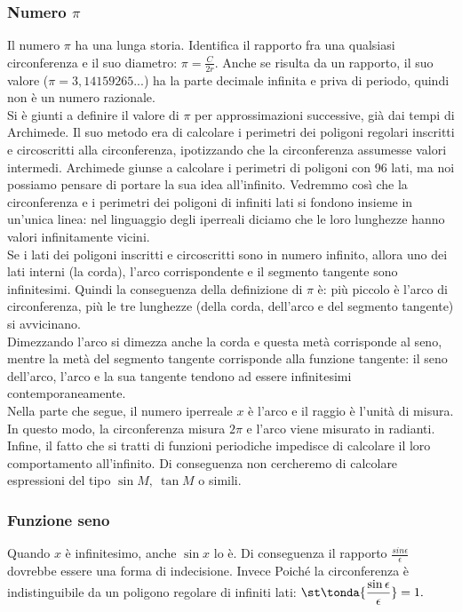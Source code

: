 \subsubsection{Numero $\pi$}
\label{subsubsec:insnum_pigreco}
Il numero $\pi$ ha una lunga storia. Identifica 
il rapporto fra una qualsiasi circonferenza e il suo diametro: 
$\pi=\frac{C}{2r}$. 
Anche se risulta da un rapporto, il suo valore ($\pi=3,14159265...$) 
ha la parte decimale infinita e priva di periodo, quindi non è un numero 
razionale.\\
Si è giunti a definire il valore di \(\pi\) per approssimazioni
successive, già dai tempi di Archimede. Il suo metodo era di
calcolare i perimetri dei poligoni regolari inscritti e
circoscritti alla circonferenza, ipotizzando che la circonferenza
assumesse valori intermedi. Archimede giunse a calcolare i perimetri
di poligoni con 96 lati, ma noi possiamo pensare di portare la sua idea
all'infinito. Vedremmo così che la circonferenza e i perimetri dei poligoni 
di infiniti lati si fondono insieme in un'unica linea: nel linguaggio degli
iperreali diciamo che le loro lunghezze hanno valori infinitamente vicini.\\
Se i lati dei poligoni inscritti e circoscritti sono in numero infinito,
allora uno dei lati interni (la corda), l'arco corrispondente e il segmento 
tangente sono infinitesimi. 
Quindi la conseguenza della definizione di \(\pi\) è:
più piccolo è l'arco di circonferenza, più le tre lunghezze (della corda, 
dell'arco e del segmento tangente) si avvicinano.\\
Dimezzando l'arco si dimezza anche la corda e questa metà corrisponde al seno,
mentre la metà del segmento tangente corrisponde alla funzione tangente:
il seno dell'arco, l'arco e la sua tangente tendono  ad essere 
infinitesimi contemporaneamente.\\
Nella parte che segue, il numero iperreale $x$ è l'arco e il raggio è l'unità 
di misura. In questo modo, la circonferenza misura $2\pi$ e l'arco 
viene misurato in radianti.\\
Infine, il fatto che si tratti di funzioni periodiche impedisce di calcolare
il loro comportamento all'infinito. Di conseguenza non cercheremo di 
calcolare 
espressioni del tipo $\sin M,\ \tan M$ o simili.

\subsubsection{Funzione seno}
\label{subsubsec:insnum_fseno}
Quando $x$ è infinitesimo, anche $\sin x$ lo è. Di conseguenza il rapporto
$\frac{sin\epsilon}{\epsilon}$ dovrebbe essere una forma di indecisione. 
Invece Poiché la circonferenza è indistinguibile da un poligono regolare di 
infiniti lati: \qquad
\(\displaystyle
 \st\tonda{\frac{\sin \epsilon}{\epsilon}}=1.
\)

